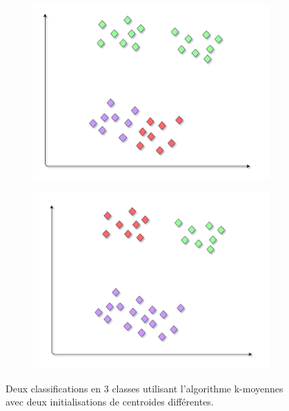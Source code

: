 \begin{figure}[ht]
  \centering
  \begin{subfigure}{.49\textwidth}
    \centering
    \includegraphics[width=.9\linewidth]{./Chapitre2/figures/kmeans1.png}
  \end{subfigure}
  \begin{subfigure}{.49\textwidth}
    \centering
    \includegraphics[width=.9\linewidth]{./Chapitre2/figures/kmeans2.png}
  \end{subfigure}
  \caption{Deux classifications en 3 classes utilisant l'algorithme k-moyennes avec deux initialisations de centroides différentes.}
  \label{fig:kmeans}
\end{figure}
